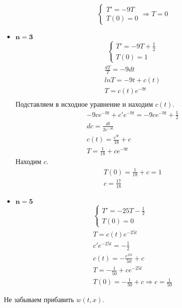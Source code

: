 \documentclass[11pt]{article}
\newenvironment{me}{
  \begin{equation}
    \begin{gathered}
      }{
    \end{gathered}
  \end{equation}
}
\begin{document}
\begin{sloppypar}
\begin{itemize}
\begin{equation}
        \begin{cases}
          T' = -9T \\
          T(0) = 0
        \end{cases}
        \Rightarrow T = 0
      \end{equation}
    \item $\mathbf{n = 3}$
      \begin{me}
        \begin{cases}
          T' = -9T + \frac{1}{2} \\
          T(0) = 1
        \end{cases}
      \end{me}
      \begin{me}
        \frac{dT}{T} = -9dt \\
        ln T = -9t + c(t) \\
        T = c(t)e^{-9t} \\
      \end{me}
      Подставляем в исходное уравнение и находим $c(t)$.
      \begin{me}
        -9ce^{-9t} + c'e^{-9t} = -9ce^{-9t} + \frac{1}{2} \\
        dc = \frac{dt}{2e^{-9t}} \\
        c(t) = \frac{e^{9t}}{18} + c \\
        T = \frac{1}{18} + ce^{-9t}
      \end{me}
      Находим $c$.
      \begin{me}
        T(0) = \frac{1}{18} + c = 1 \\
        c = \frac{17}{18}
      \end{me}
    \item $\mathbf{n = 5}$
      \begin{me}
        \begin{cases}
          T' = -25T - \frac{1}{2} \\
          T(0) = 0
        \end{cases} \\
        T = c(t)e^{-25t} \\
        c'e^{-25t} = - \frac{1}{2} \\
        c(t) = - \frac{e^{25t}}{50} + c \\
        T = - \frac{1}{50} + ce^{-25t} \\
        T(0) = - \frac{1}{50} + c \Rightarrow c = \frac{1}{50}
      \end{me}
  \end{itemize}
  Не забываем прибавить $w(t, x)$.
  

\end{sloppypar}
\end{document}
